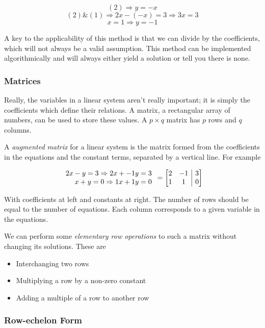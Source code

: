 \documentclass[12pt]{report}
\makeatletter
\newenvironment{amatrix}[1]{%
  \left[\begin{array}{@{}*{#1}{c}|c@{}}
}{%
  \end{array}\right]
}
\makeatother
\begin{document}
\begin{flushleft}
\[(2) \Rightarrow y = -x\]
\[(2) \& (1) \Rightarrow 2x - (-x) = 3 \Rightarrow 3x = 3\]
\[x = 1 \Rightarrow y = -1\]

A key to the applicability of this method is that we can divide by the
coefficients, which will not always be a valid assumption. This method can
be implemented algorithmically and will always either yield a solution or tell
you there is none.

\subsubsection*{Matrices}

Really, the variables in a linear system aren't really important; it is simply
the coefficients which define their relations. A matrix, a rectangular array of
numbers, can be used to store these values. A \(p \times q\) matrix has \(p\)
rows and \(q\) columns.

A \textit{augmented matrix} for a linear system is the matrix formed from the
coefficients in the equations and the constant terms, separated by a vertical
line. For example

\[
    \begin{array}{r}
        2x - y = 3 \Rightarrow 2x + -1y = 3 \\
        x + y = 0 \Rightarrow 1x + 1y = 0
    \end{array}
    =
    \begin{amatrix}{2}
        2 & -1 & 3 \\ 1 & 1 & 0
    \end{amatrix}
\]

With coefficients at left and constants at right. The number of rows should be
equal to the number of equations. Each column corresponds to a given variable
in the equations.

We can perform some \textit{elementary row operations} to such a matrix without
changing its solutions. These are
\begin{itemize}
    \item Interchanging two rows
    \item Multiplying a row by a non-zero constant
    \item Adding a multiple of a row to another row
\end{itemize}

\subsubsection*{Row-echelon Form}


\end{flushleft}
\end{document}
